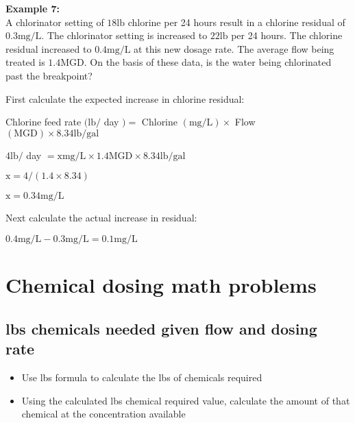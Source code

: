 \textbf{Example 7:}\\
A chlorinator setting of $18 \mathrm{lb}$ chlorine per 24 hours result in a chlorine residual of $0.3 \mathrm{mg} / \mathrm{L}$. The chlorinator setting is increased to $22 \mathrm{lb}$ per 24 hours. The chlorine residual increased to $0.4 \mathrm{mg} / \mathrm{L}$ at this new dosage rate. The average flow being treated is $1.4 \mathrm{MGD}$. On the basis of these data, is the water being chlorinated past the breakpoint?

First calculate the expected increase in chlorine residual:

Chlorine feed rate $(\mathrm{lb} /$ day $)=$ Chlorine $(\mathrm{mg} / \mathrm{L}) \times$ Flow $(\mathrm{MGD}) \times 8.34 \mathrm{lb} / \mathrm{gal}$

$4 \mathrm{lb} /$ day $=\mathrm{x} \mathrm{mg} / \mathrm{L} \times 1.4 \mathrm{MGD} \times 8.34 \mathrm{lb} / \mathrm{gal}$

$\mathrm{x}=4 /(1.4 \times 8.34)$

$\mathrm{x}=0.34 \mathrm{mg} / \mathrm{L}$

Next calculate the actual increase in residual:

$0.4 \mathrm{mg} / \mathrm{L}-0.3 \mathrm{mg} / \mathrm{L}=0.1 \mathrm{mg} / \mathrm{L}$

\section{Chemical dosing math problems}
\subsection{lbs chemicals needed given flow and dosing rate}

\begin{itemize}
\item Use lbs formula to calculate the lbs of chemicals required\\
\item Using the calculated lbs chemical required value, calculate the amount of that chemical at the concentration available
\end{itemize}

